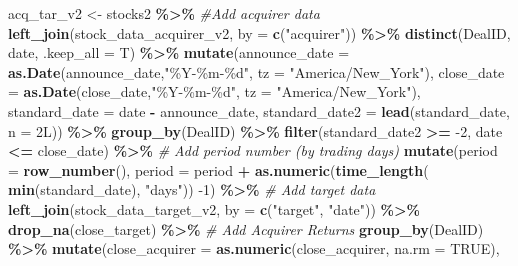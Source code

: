 \documentclass[
]{article}
\newenvironment{Shaded}{\begin{snugshade}}{\end{snugshade}}
\newcommand{\CommentTok}[1]{\textcolor[rgb]{0.56,0.35,0.01}{\textit{#1}}}
\newcommand{\DataTypeTok}[1]{\textcolor[rgb]{0.13,0.29,0.53}{#1}}
\newcommand{\DecValTok}[1]{\textcolor[rgb]{0.00,0.00,0.81}{#1}}
\newcommand{\KeywordTok}[1]{\textcolor[rgb]{0.13,0.29,0.53}{\textbf{#1}}}
\newcommand{\NormalTok}[1]{#1}
\newcommand{\OperatorTok}[1]{\textcolor[rgb]{0.81,0.36,0.00}{\textbf{#1}}}
\newcommand{\OtherTok}[1]{\textcolor[rgb]{0.56,0.35,0.01}{#1}}
\newcommand{\StringTok}[1]{\textcolor[rgb]{0.31,0.60,0.02}{#1}}
\begin{document}
\begin{Shaded}
\begin{Highlighting}[]
\NormalTok{acq\_tar\_v2 \textless{}{-}}\StringTok{ }\NormalTok{stocks2 }\OperatorTok{\%\textgreater{}\%}
\StringTok{  }
\StringTok{  }\CommentTok{\#Add acquirer data}
\StringTok{  }\KeywordTok{left\_join}\NormalTok{(stock\_data\_acquirer\_v2, }\DataTypeTok{by =} \KeywordTok{c}\NormalTok{(}\StringTok{"acquirer"}\NormalTok{)) }\OperatorTok{\%\textgreater{}\%}
\StringTok{  }\KeywordTok{distinct}\NormalTok{(DealID, date, }\DataTypeTok{.keep\_all =}\NormalTok{ T) }\OperatorTok{\%\textgreater{}\%}\StringTok{ }
\StringTok{  }\KeywordTok{mutate}\NormalTok{(}\DataTypeTok{announce\_date =} \KeywordTok{as.Date}\NormalTok{(announce\_date,}\StringTok{"\%Y{-}\%m{-}\%d"}\NormalTok{, }\DataTypeTok{tz =} \StringTok{"America/New\_York"}\NormalTok{),}
         \DataTypeTok{close\_date =} \KeywordTok{as.Date}\NormalTok{(close\_date,}\StringTok{"\%Y{-}\%m{-}\%d"}\NormalTok{, }\DataTypeTok{tz =} \StringTok{"America/New\_York"}\NormalTok{),}
         \DataTypeTok{standard\_date =}\NormalTok{ date }\OperatorTok{{-}}\StringTok{ }\NormalTok{announce\_date,}
         \DataTypeTok{standard\_date2 =} \KeywordTok{lead}\NormalTok{(standard\_date, }\DataTypeTok{n =}\NormalTok{ 2L)) }\OperatorTok{\%\textgreater{}\%}\StringTok{ }
\StringTok{  }\KeywordTok{group\_by}\NormalTok{(DealID) }\OperatorTok{\%\textgreater{}\%}\StringTok{ }
\StringTok{  }\KeywordTok{filter}\NormalTok{(standard\_date2 }\OperatorTok{\textgreater{}=}\StringTok{ }\DecValTok{{-}2}\NormalTok{,}
\NormalTok{         date }\OperatorTok{\textless{}=}\StringTok{ }\NormalTok{close\_date) }\OperatorTok{\%\textgreater{}\%}
\StringTok{  }\CommentTok{\# Add period number (by trading days)}
\StringTok{  }\KeywordTok{mutate}\NormalTok{(}\DataTypeTok{period =} \KeywordTok{row\_number}\NormalTok{(),}
         \DataTypeTok{period =}\NormalTok{ period }\OperatorTok{+}\StringTok{ }\KeywordTok{as.numeric}\NormalTok{(}\KeywordTok{time\_length}\NormalTok{( }\KeywordTok{min}\NormalTok{(standard\_date), }\StringTok{"days"}\NormalTok{)) }\DecValTok{{-}1}\NormalTok{) }\OperatorTok{\%\textgreater{}\%}\StringTok{ }
\StringTok{  }
\StringTok{  }\CommentTok{\# Add target data}
\StringTok{  }\KeywordTok{left\_join}\NormalTok{(stock\_data\_target\_v2, }\DataTypeTok{by =} \KeywordTok{c}\NormalTok{(}\StringTok{"target"}\NormalTok{, }\StringTok{"date"}\NormalTok{)) }\OperatorTok{\%\textgreater{}\%}
\StringTok{  }\KeywordTok{drop\_na}\NormalTok{(close\_target) }\OperatorTok{\%\textgreater{}\%}
\StringTok{  }
\StringTok{  }\CommentTok{\# Add Acquirer Returns}
\StringTok{  }\KeywordTok{group\_by}\NormalTok{(DealID) }\OperatorTok{\%\textgreater{}\%}
\StringTok{  }\KeywordTok{mutate}\NormalTok{(}\DataTypeTok{close\_acquirer =} \KeywordTok{as.numeric}\NormalTok{(close\_acquirer, }\DataTypeTok{na.rm =} \OtherTok{TRUE}\NormalTok{),}

\end{Highlighting}
\end{Shaded}
\end{document}
